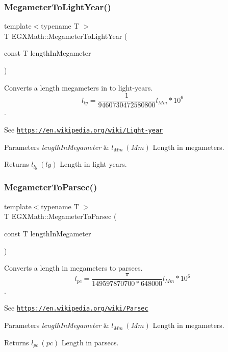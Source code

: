\subsubsection{\texorpdfstring{Megameter\+To\+Light\+Year()}{MegameterToLightYear()}}
{\footnotesize\ttfamily template$<$typename T $>$ \\
T E\+G\+X\+Math\+::\+Megameter\+To\+Light\+Year (\begin{DoxyParamCaption}\item[{const T}]{length\+In\+Megameter }\end{DoxyParamCaption})}



Converts a length megameters in to light-\/years. \[ l_{ly}= \frac{1}{9460730472580800} l_{Mm} * 10^{6} \]. 

See \href{https://en.wikipedia.org/wiki/Light-year}{\tt https\+://en.\+wikipedia.\+org/wiki/\+Light-\/year} 
\begin{DoxyParams}{Parameters}
{\em length\+In\+Megameter} & $ l_{Mm}\ (Mm)$ Length in megameters. \\
\hline
\end{DoxyParams}
\begin{DoxyReturn}{Returns}
$ l_{ly}\ (ly)$ Length in light-\/years. 
\end{DoxyReturn}
\mbox{\label{group___e_g_x_math-_conversions-_length_conversions-_s_i-_megameter-_astronomical_gaec774451afc484c6fa69d2cfcd3dbf06}} 
\subsubsection{\texorpdfstring{Megameter\+To\+Parsec()}{MegameterToParsec()}}
{\footnotesize\ttfamily template$<$typename T $>$ \\
T E\+G\+X\+Math\+::\+Megameter\+To\+Parsec (\begin{DoxyParamCaption}\item[{const T}]{length\+In\+Megameter }\end{DoxyParamCaption})}



Converts a length in megameters to parsecs. \[ l_{pc}=\frac{\pi}{149597870700 * 648000} l_{Mm} * 10^{6} \]. 

See \href{https://en.wikipedia.org/wiki/Parsec}{\tt https\+://en.\+wikipedia.\+org/wiki/\+Parsec} 
\begin{DoxyParams}{Parameters}
{\em length\+In\+Megameter} & $ l_{Mm}\ (Mm)$ Length in megameters. \\
\hline
\end{DoxyParams}
\begin{DoxyReturn}{Returns}
$ l_{pc}\ (pc)$ Length in parsecs. 
\end{DoxyReturn}
